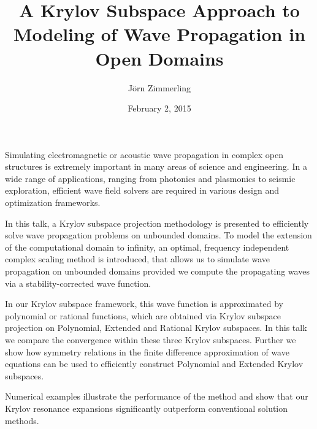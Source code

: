 \documentclass{article}
\title{A Krylov Subspace Approach to Modeling of Wave Propagation in Open Domains}
\author{J\"orn Zimmerling}
\affil{PhD student at TU Delft}
\date{February 2, 2015}
\begin{document}
\maketitle
\setcounter{page}{8}
Simulating electromagnetic or acoustic wave propagation in complex open structures is extremely important in many areas of science and engineering. In a wide range of applications, ranging from photonics and plasmonics to seismic exploration, efficient wave field solvers are required in various design and optimization frameworks.  
 
In this talk, a Krylov subspace projection methodology is presented to efficiently solve wave propagation problems on unbounded domains. To model the extension of the computational domain to infinity, an optimal, frequency independent complex scaling method is introduced, that allows us to simulate wave propagation on unbounded domains provided we compute the propagating waves via a stability-corrected wave function.

In our Krylov subspace framework, this wave function is approximated by polynomial or rational functions, which are obtained via Krylov subspace projection on Polynomial, Extended and Rational Krylov subspaces. In this talk we compare the convergence within these three Krylov subspaces. Further we show how symmetry relations in the finite difference approximation of wave equations can be used to efficiently construct Polynomial and Extended Krylov subspaces. 

Numerical examples illustrate the performance of the method and show that our Krylov resonance expansions significantly outperform conventional solution methods.
\end{document}
